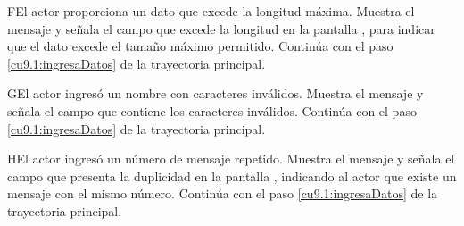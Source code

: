  \begin{UCtrayectoriaA}{F}{El actor proporciona un dato que excede la longitud máxima.}
    \UCpaso[\UCsist] Muestra el mensaje  y señala el campo que excede la 
    longitud en la pantalla , para indicar que el dato excede el tamaño máximo permitido.
    \UCpaso[] Continúa con el paso \ref{cu9.1:ingresaDatos} de la trayectoria principal.
 \end{UCtrayectoriaA}
 
 \begin{UCtrayectoriaA}{G}{El actor ingresó un nombre con caracteres inválidos.}
    \UCpaso[\UCsist] Muestra el mensaje  y señala el campo que contiene los caracteres inválidos.
    \UCpaso[] Continúa con el paso \ref{cu9.1:ingresaDatos} de la trayectoria principal.
 \end{UCtrayectoriaA}
 \begin{UCtrayectoriaA}{H}{El actor ingresó un número de mensaje repetido.}
    \UCpaso[\UCsist] Muestra el mensaje  y señala el campo que presenta la duplicidad en la pantalla 
	    , indicando al actor que existe un mensaje con el mismo número.
    \UCpaso[] Continúa con el paso \ref{cu9.1:ingresaDatos} de la trayectoria principal.
 \end{UCtrayectoriaA}